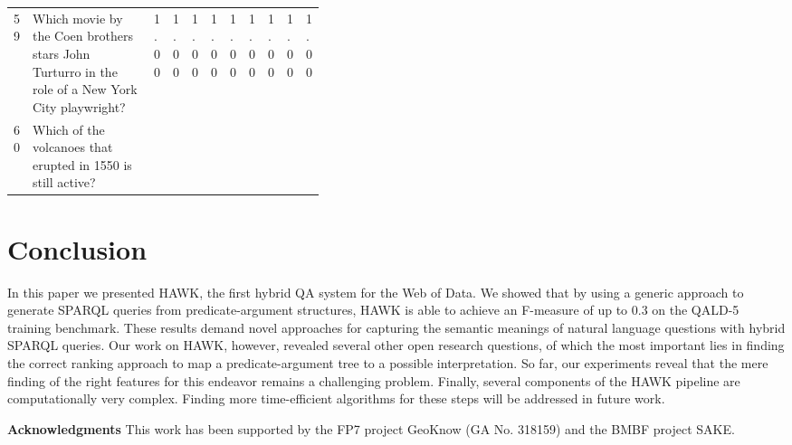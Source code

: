 \documentclass{llncs}
\begin{document}
\begin{table}[h]
\begin{tabular}{@{}lp{0.4\linewidth}lllllllll@{}}
59       & Which movie by the Coen brothers stars John Turturro in the role of a New York City playwright?             & 1.00                        & 1.00                         & 1.00                         & 1.00                      & 1.00                      & 1.00                      & 1.00                     & 1.00                     & 1.00                     \\
60       & Which of the volcanoes that erupted in 1550 is still active?                                                & \cellcolor[HTML]{BBDAFF}    & \cellcolor[HTML]{BBDAFF}     & \cellcolor[HTML]{BBDAFF}     & \cellcolor[HTML]{BBDAFF}  & \cellcolor[HTML]{BBDAFF}  & \cellcolor[HTML]{BBDAFF}  & \cellcolor[HTML]{BBDAFF} & \cellcolor[HTML]{BBDAFF} & \cellcolor[HTML]{BBDAFF} \\ \bottomrule
\end{tabular}
\label{tab:eval_qal5_detail}

\end{table}

\section{Conclusion}
\label{sec:conclusion}

In this paper we presented HAWK, the first hybrid QA system for the Web of Data. We showed that by using a generic approach to generate SPARQL queries from predicate-argument structures, HAWK is able to achieve an F-measure of up to 0.3 on the QALD-5 training benchmark. 
These results demand novel approaches for capturing the semantic meanings of natural language questions with hybrid SPARQL queries.
Our work on HAWK, however, revealed several other open research questions, of which the most important lies in finding the correct ranking approach to map a predicate-argument tree to a possible interpretation. 
So far, our experiments reveal that the mere finding of the right features for this endeavor remains a challenging problem. 
Finally, several components of the HAWK pipeline are computationally very complex.
Finding more time-efficient algorithms for these steps will be addressed in future work.

\vspace{.2cm}

\textbf{Acknowledgments}
This work has been supported by the FP7 project GeoKnow (GA No. 318159) and the BMBF project SAKE.



\end{document}
